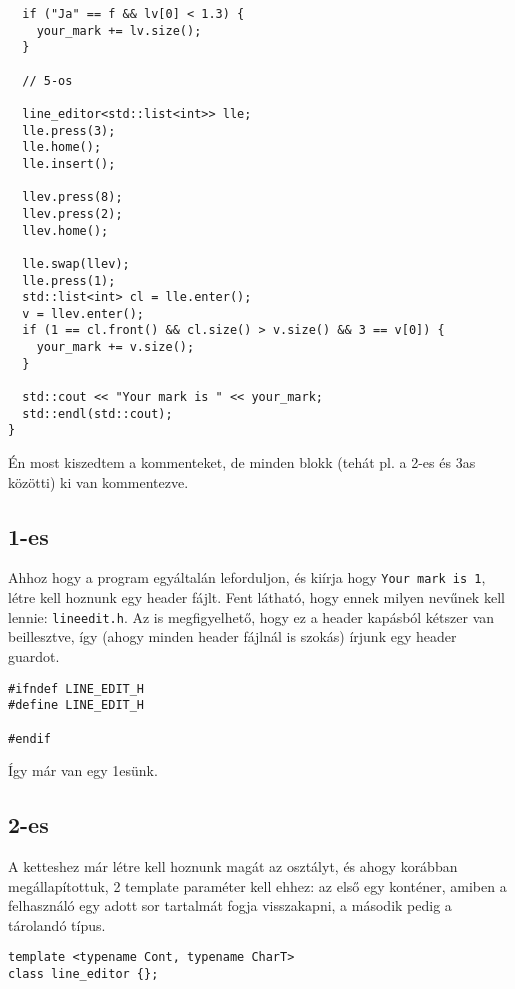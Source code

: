 \documentclass[../cpp_book/cpp_book.tex]{subfiles}
\begin{document}
\begin{lstlisting}
  if ("Ja" == f && lv[0] < 1.3) {
    your_mark += lv.size();
  }

  // 5-os

  line_editor<std::list<int>> lle;
  lle.press(3);
  lle.home();
  lle.insert();

  llev.press(8);
  llev.press(2);
  llev.home();

  lle.swap(llev);
  lle.press(1);
  std::list<int> cl = lle.enter();
  v = llev.enter();
  if (1 == cl.front() && cl.size() > v.size() && 3 == v[0]) {
    your_mark += v.size();
  }

  std::cout << "Your mark is " << your_mark;
  std::endl(std::cout);
}
\end{lstlisting}

	\begin{note}
		Én most kiszedtem a kommenteket, de minden blokk (tehát pl. a 2-es és 3as közötti) ki van kommentezve.
	\end{note}
	\subsection{1-es}
	Ahhoz hogy a program egyáltalán leforduljon, és kiírja hogy \texttt{Your mark is 1}, létre kell hoznunk egy header fájlt. Fent látható, hogy ennek milyen nevűnek kell lennie: \texttt{lineedit.h}. Az is megfigyelhető, hogy ez a header kapásból kétszer van beillesztve, így (ahogy minden header fájlnál is szokás) írjunk egy header guardot.
	\begin{lstlisting}
#ifndef LINE_EDIT_H
#define LINE_EDIT_H

#endif
	\end{lstlisting}
	Így már van egy 1esünk.
	\subsection{2-es}
	A ketteshez már létre kell hoznunk magát az osztályt, és ahogy korábban megállapítottuk, 2 template paraméter kell ehhez: az első egy konténer, amiben a felhasználó egy adott sor tartalmát fogja visszakapni, a második pedig a tárolandó típus.
	\begin{lstlisting}
template <typename Cont, typename CharT>
class line_editor {};
	\end{lstlisting}
	
\end{document}
